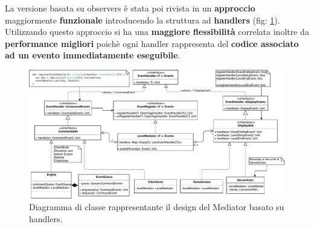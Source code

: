 La versione basata su observers è stata poi rivista in un \textbf{approccio} maggiormente \textbf{funzionale} introducendo la struttura ad \textbf{handlers} (fig: \ref{fig:mediatorHandler}). Utilizzando questo approccio si ha una \textbf{maggiore flessibilità} correlata inoltre da \textbf{performance migliori} poichè ogni handler rappresenta del \textbf{codice associato ad un evento immediatamente eseguibile}.
\begin{figure}[H]
	\centering
	\includegraphics[width=0.99\columnwidth]{drawio/mediator/mediatorHandler.pdf}
	\caption{Diagramma di classe rappresentante il design del Mediator basato su handlers.}
	\label{fig:mediatorHandler}
\end{figure}